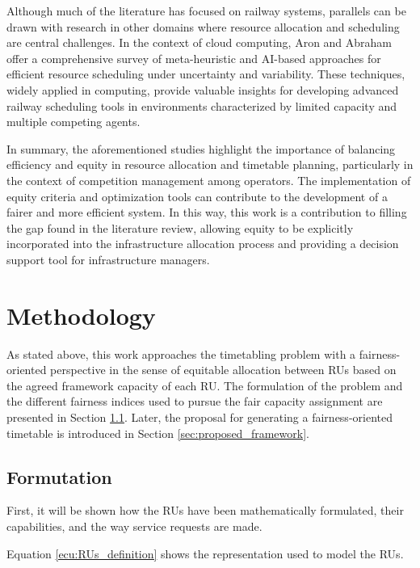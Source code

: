 \documentclass[preprint,12pt]{elsarticle}
\begin{document}
Although much of the literature has focused on railway systems, parallels can be drawn with research in other domains where resource allocation and scheduling are central challenges. In the context of cloud computing, Aron and Abraham \cite{Aron2022} offer a comprehensive survey of meta-heuristic and AI-based approaches for efficient resource scheduling under uncertainty and variability. These techniques, widely applied in computing, provide valuable insights for developing advanced railway scheduling tools in environments characterized by limited capacity and multiple competing agents. 

In summary, the aforementioned studies highlight the importance of balancing efficiency and equity in resource allocation and timetable planning, particularly in the context of competition management among operators. The implementation of equity criteria and optimization tools can contribute to the development of a fairer and more efficient system. In this way, this work is a contribution to filling the gap found in the literature review, allowing equity to be explicitly incorporated into the infrastructure allocation process and providing a decision support tool for infrastructure managers. 

\section{Methodology}\label{sec:Methodology}

As stated above, this work approaches the timetabling problem with a fairness-oriented perspective in the sense of equitable allocation between \glspl{RU} based on the agreed framework capacity of each RU. The formulation of the problem  and the different fairness indices used to pursue the fair capacity assignment are presented in Section \ref{sec:formulation}. Later, the proposal for generating a fairness-oriented timetable is introduced in Section \ref{sec:proposed_framework}.

\subsection{Formutation}\label{sec:formulation}

First, it will be shown how the \glspl{RU} have been mathematically formulated, their capabilities, and the way service requests are made. 

Equation \ref{ecu:RUs_definition} shows the representation used to model the \glspl{RU}.
\end{document}
